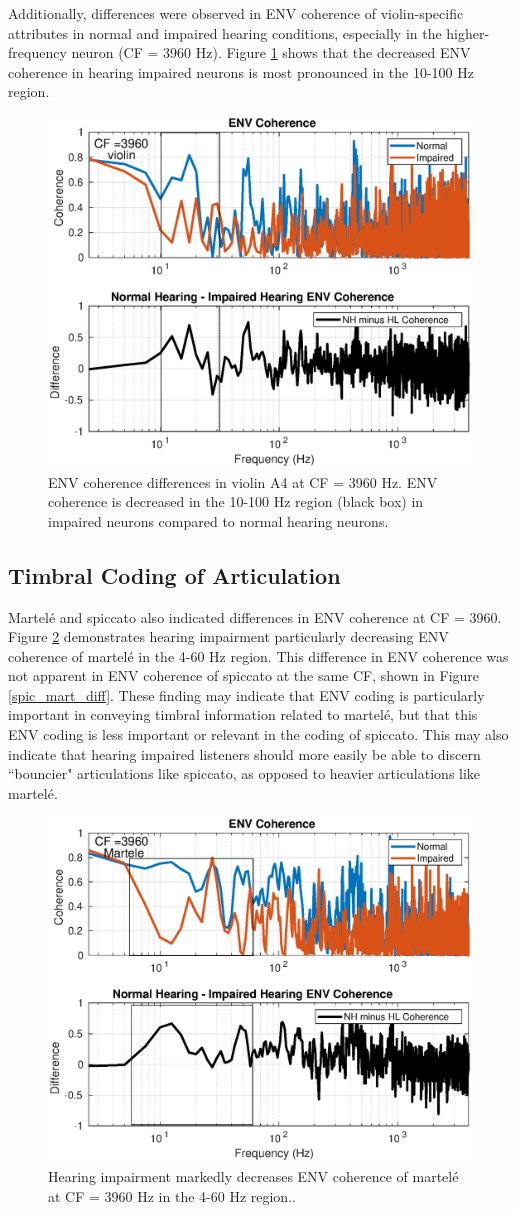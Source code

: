 \documentclass[conference]{IEEEtran}
\begin{document}
Additionally, differences were observed in ENV coherence of violin-specific attributes in normal and impaired hearing conditions, especially in the higher-frequency neuron (CF = 3960 Hz). Figure \ref{viol_env} shows that the decreased ENV coherence in hearing impaired neurons is most pronounced in the 10-100 Hz region. 

\begin{figure}[h]
\includegraphics[width = .5\textwidth]{violin_ENV_COH_3960}
\caption{ENV coherence differences in violin A4 at CF = 3960 Hz. ENV coherence is decreased in the 10-100 Hz region (black box) in impaired neurons compared to normal hearing neurons.}
\label{viol_env}
\end{figure} 



\subsection{Timbral Coding of Articulation}

Martel\'{e} and spiccato also indicated differences in ENV coherence at CF = 3960. Figure \ref{mart_env} demonstrates hearing impairment particularly decreasing ENV coherence of martel\'{e} in the 4-60 Hz region. This difference in ENV coherence was not apparent in ENV coherence of spiccato at the same CF, shown in Figure \ref{spic_mart_diff}. These finding may indicate that ENV coding is particularly important in conveying timbral information related to martel\'{e}, but that this ENV coding is less important or relevant in the coding of spiccato. This may also indicate that hearing impaired listeners should more easily be able to discern ``bouncier" articulations like spiccato, as opposed to heavier articulations like martel\'{e}. 
\begin{figure}[h]
\includegraphics[width = .5\textwidth]{martele_ENV_diff}
\caption{Hearing impairment markedly decreases ENV coherence of martel\'{e} at CF = 3960 Hz in the 4-60 Hz region.. }
\label{mart_env}
\end{figure} 
\end{document}
